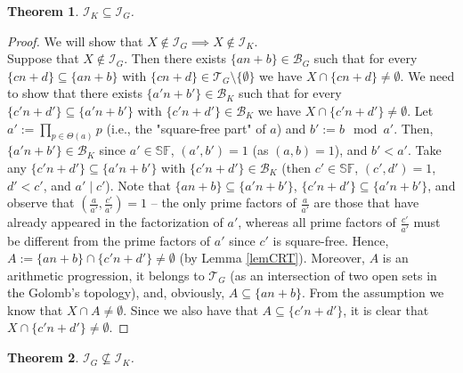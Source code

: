 \documentclass{amsart}
\newtheorem{thm}{Theorem}[section]
\theoremstyle{definition}
\newcommand{\I}{\mathcal I}
\newcommand{\T}{\mathcal{T}}
\newcommand{\B}{\mathcal{B}}
\newcommand{\SqrFr}{\mathbb{SF}}
\begin{document}
\begin{thm}
$\I_K \subseteq \I_G$.
\end{thm}

\begin{proof}
We will show that $X \not\in \I_G \implies X \not\in \I_K$.\\
Suppose that $X \not\in \I_G$. Then there exists $\{an+b\}\in \B_G$ such that for every $\{cn+d\}\subseteq \{an+b\}$ with $\{cn+d\}\in \T_G\setminus\{\emptyset\}$ we have $X\cap \{cn+d\} \neq \emptyset$.
We need to show that there exists $\{a'n+b'\}\in \B_K$ such that for every $\{c'n+d'\}\subseteq \{a'n+b'\}$ with $\{c'n+d'\}\in \B_K$ we have $X\cap \{c'n+d'\} \neq \emptyset$.
Let $a' := \prod_{p\in\Theta(a)}{p}$ (i.e., the "square-free part" of $a$) and $b' := b \mod a'$. Then, $\{a'n+b'\} \in \B_K$ since $a' \in \SqrFr$, $(a',b') = 1$ (as $(a,b) = 1$), and $b'<a'$.
Take any $\{c'n+d'\} \subseteq \{a'n+b'\}$ with $\{c'n+d'\}\in \B_K$ (then $c' \in \SqrFr$, $(c',d')=1$, $d'<c'$, and $a'\mid c'$).
Note that $\{an+b\}\subseteq \{a'n+b'\}$, $\{c'n+d'\}\subseteq \{a'n+b'\}$, and observe that $\left(\frac{a}{a'}, \frac{c'}{a'}\right) = 1$ -- the only prime factors of $\frac{a}{a'}$ are those that have already appeared in the factorization of $a'$, whereas all prime factors of $\frac{c'}{a'}$ must be different from the prime factors of $a'$ since $c'$ is square-free. 
Hence, $A:= \{an+b\}\cap\{c'n+d'\} \neq \emptyset$ (by Lemma \ref{lemCRT}). Moreover, $A$ is an arithmetic progression, it belongs to $\T_G$ (as an intersection of two open sets in the Golomb's topology), and, obviously, $A \subseteq \{an+b\}$. From the assumption we know that $X\cap A \neq \emptyset$. Since we also have that $A \subseteq \{c'n+d'\}$, it is clear that $X\cap \{c'n+d'\} \neq \emptyset$.
\end{proof}

\begin{thm}
$\I_G \not\subseteq \I_K$.
\end{thm}
\end{document}
